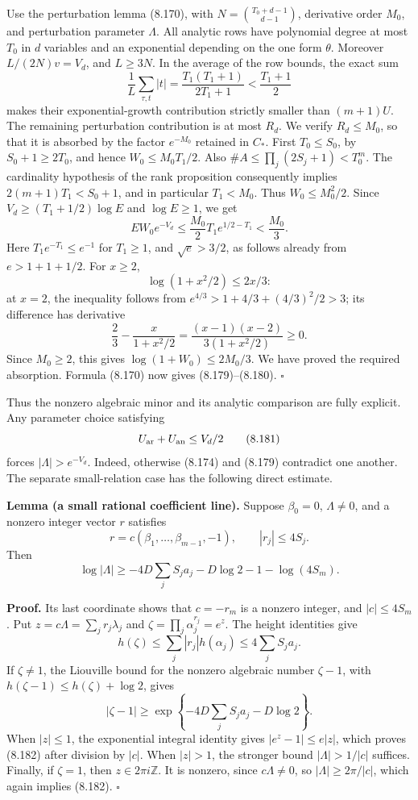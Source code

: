 \documentclass[
  11pt,
  a4paper,
]{article}
\begin{document}
Use the perturbation lemma (8.170), with \(N=\binom{T_0+d-1}{d-1}\),
derivative order \(M_0\), and perturbation parameter \(\Lambda\). All
analytic rows have polynomial degree at most \(T_0\) in \(d\) variables
and an exponential depending on the one form \(\theta\). Moreover
\(L/(2N)v=V_d\), and \(L\ge3N\). In the average of the row bounds, the
exact sum \[
\frac1L\sum_{\tau,t}|t|
=\frac{T_1(T_1+1)}{2T_1+1}
<\frac{T_1+1}{2}
\] makes their exponential-growth contribution strictly smaller than
\((m+1)U\). The remaining perturbation contribution is at most \(R_d\).
We verify \(R_d\le M_0\), so that it is absorbed by the factor
\(e^{-M_0}\) retained in \(C_*\). First \(T_0\le S_0\), by
\(S_0+1\ge2T_0\), and hence \(W_0\le M_0T_1/2\). Also
\(\#A\le\prod_j(2S_j+1)<T_0^m\). The cardinality hypothesis of the rank
proposition consequently implies \(2(m+1)T_1<S_0+1\), and in particular
\(T_1<M_0\). Thus \(W_0\le M_0^2/2\). Since \(V_d\ge(T_1+1/2)\log E\)
and \(\log E\ge1\), we get \[
EW_0e^{-V_d}
\le\frac{M_0}{2}T_1e^{1/2-T_1}<\frac{M_0}{3}.
\] Here \(T_1e^{-T_1}\le e^{-1}\) for \(T_1\ge1\), and \(\sqrt e>3/2\),
as follows already from \(e>1+1+1/2\). For \(x\ge2\), \[
\log(1+x^2/2)\le2x/3:
\] at \(x=2\), the inequality follows from
\(e^{4/3}>1+4/3+(4/3)^2/2>3\); its difference has derivative \[
\frac23-\frac{x}{1+x^2/2}
=\frac{(x-1)(x-2)}{3(1+x^2/2)}\ge0.
\] Since \(M_0\ge2\), this gives \(\log(1+W_0)\le2M_0/3\). We have
proved the required absorption. Formula (8.170) now gives
(8.179)--(8.180). \(\square\)

Thus the nonzero algebraic minor and its analytic comparison are fully
explicit. Any parameter choice satisfying \[
U_{\rm ar}+U_{\rm an}\le V_d/2
\tag{8.181}
\] forces \(|\Lambda|>e^{-V_d}\). Indeed, otherwise (8.174) and (8.179)
contradict one another. The separate small-relation case has the
following direct estimate.

\textbf{Lemma (a small rational coefficient line).} Suppose
\(\beta_0=0\), \(\Lambda\ne0\), and a nonzero integer vector \(r\)
satisfies \[
r=c(\beta_1,\ldots,\beta_{m-1},-1),
\qquad |r_j|\le4S_j.
\] Then \[
\log|\Lambda|\ge
-4D\sum_jS_ja_j-D\log2-1-\log(4S_m).
\tag{8.182}
\]

\textbf{Proof.} Its last coordinate shows that \(c=-r_m\) is a nonzero
integer, and \(|c|\le4S_m\). Put \(z=c\Lambda=\sum_jr_j\lambda_j\) and
\(\zeta=\prod_j\alpha_j^{r_j}=e^z\). The height identities give \[
h(\zeta)\le\sum_j|r_j|h(\alpha_j)\le4\sum_jS_ja_j.
\] If \(\zeta\ne1\), the Liouville bound for the nonzero algebraic
number \(\zeta-1\), with \(h(\zeta-1)\le h(\zeta)+\log2\), gives \[
|\zeta-1|\ge
\exp\left\{-4D\sum_jS_ja_j-D\log2\right\}.
\] When \(|z|\le1\), the exponential integral identity gives
\(|e^z-1|\le e|z|\), which proves (8.182) after division by \(|c|\).
When \(|z|>1\), the stronger bound \(|\Lambda|>1/|c|\) suffices.
Finally, if \(\zeta=1\), then \(z\in2\pi i\mathbb Z\). It is nonzero,
since \(c\Lambda\ne0\), so \(|\Lambda|\ge2\pi/|c|\), which again implies
(8.182). \(\square\)
\end{document}
